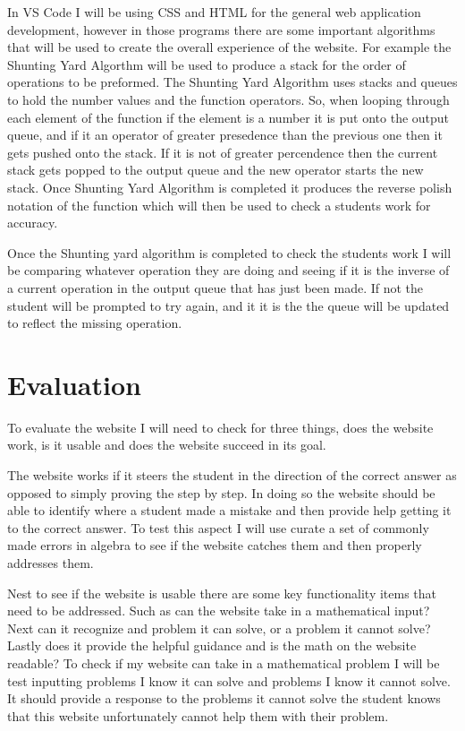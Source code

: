 \documentclass[10pt,twocolumn]{article}
\begin{document}
In VS Code I will be using CSS and HTML for the general web application development, however in those programs there are some important algorithms that will be used to create the overall experience of the website. For example the Shunting Yard Algorthm will be used to produce a stack for the order of operations to be preformed. The Shunting Yard Algorithm uses stacks and queues to hold the number values and the function operators. So, when looping through each element of the function if the element is a number it is put onto the output queue, and if it an operator of greater presedence than the previous one then it gets pushed onto the stack. If it is not of greater percendence then the current stack gets popped to the output queue and the new operator starts the new stack. Once Shunting Yard Algorithm is completed it produces the reverse polish notation of the function which will then be used to check a students work for accuracy.   

Once the Shunting yard algorithm is completed to check the students work I will be comparing whatever operation they are doing and seeing if it is the inverse of a current operation in the output queue that has just been made. If not the student will be prompted to try again, and it it is the the queue will be updated to reflect the missing operation. 



\section{Evaluation}
To evaluate the website I will need to check for three things, does the website work, is it usable and does the website succeed in its goal. 

The website works if it steers the student in the direction of the correct answer as opposed to simply proving the step by step. In doing so the website should be able to identify where a student made a mistake and then provide help getting it to the correct answer. To test this aspect I will use curate a set of commonly made errors in algebra to see if the website catches them and then properly addresses them.  %

Nest to see if the website is usable there are some key functionality items that need to be addressed. Such as can the website take in a mathematical input? Next can it recognize and problem it can solve, or a problem it cannot solve? Lastly does it provide the helpful guidance and is the math on the website readable? To check if my website can take in a mathematical problem I will be test inputting problems I know it can solve and problems I know it cannot solve. It should provide a response to the problems it cannot solve the student knows that this website unfortunately cannot help them with their problem. 
\end{document}
